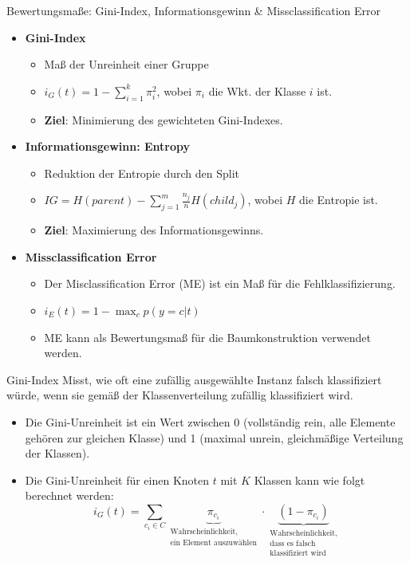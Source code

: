 \documentclass{beamer}
\begin{document}
\begin{frame}{Bewertungsmaße: Gini-Index, Informationsgewinn \& Missclassification Error}
	\begin{itemize}
		\item{\textbf{Gini-Index}}
		\begin{itemize}
			\item Maß der Unreinheit einer Gruppe
			\item $i_G (t) = 1 - \sum_{i=1}^k \pi_i^2$, wobei $\pi_i$ die Wkt. der Klasse $i$ ist.
			\item \textbf{Ziel}: Minimierung des gewichteten Gini-Indexes.
		\end{itemize}
		\item{\textbf{Informationsgewinn: Entropy}}
		\begin{itemize}
			\item Reduktion der Entropie durch den Split
			\item $IG = H(parent) - \sum_{j=1}^m \frac{n_j}{n} H(child_j)$, wobei $H$ die Entropie ist.
			\item \textbf{Ziel}: Maximierung des Informationsgewinns.
		\end{itemize}
		\item{\textbf{Missclassification Error}}
		\begin{itemize}
			\item {Der Misclassification Error (ME) ist ein Maß für die Fehlklassifizierung.}
			\item $i_E (t) = 1 - \max_c p(y = c | t)$
			\item {ME kann als Bewertungsmaß für die Baumkonstruktion verwendet werden.}
		\end{itemize}
	\end{itemize}
\end{frame}


\begin{frame}{Gini-Index}
Misst, wie oft eine zufällig ausgewählte Instanz falsch klassifiziert würde, wenn sie gemäß der Klassenverteilung zufällig klassifiziert wird.

\begin{itemize}
    \item Die Gini-Unreinheit ist ein Wert zwischen 0 (vollständig rein, alle Elemente gehören zur gleichen Klasse) und 1 (maximal unrein, gleichmäßige Verteilung der Klassen).
    \item Die Gini-Unreinheit für einen Knoten $t$ mit $K$ Klassen kann wie folgt berechnet werden:
    \[
    i_G (t) = \sum_{c_i \in C} \underbrace{\pi_{c_i}}_{\substack{\text{Wahrscheinlichkeit,} \\ \text{ein Element auszuwählen}}} \cdot \underbrace{(1 - \pi_{c_i})}_{\substack{\text{Wahrscheinlichkeit,} \\ \text{dass es falsch} \\ \text{klassifiziert wird}}}
    \]
\end{itemize}
\end{frame}
\end{document}
